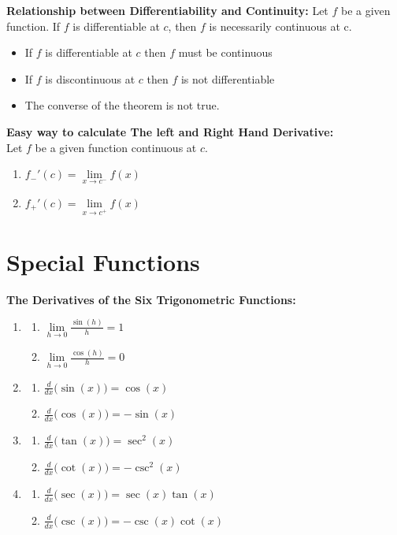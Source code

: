 \documentclass[14pt]{article}
\begin{document}
    \textbf{Relationship between Differentiability and Continuity:}
    Let $f$ be a given function. If $f$ is differentiable at $c$, then
    $f$ is necessarily continuous at c.
    \begin{itemize}
        \item If $f$ is differentiable at $c$ then $f$ must be
        continuous
        \item If $f$ is discontinuous at $c$ then $f$ is not
        differentiable
        \item The converse of the theorem is not true.
    \end{itemize} 
    \textbf{Easy way to calculate The left and Right Hand Derivative:}\\
    Let $f$ be a given function continuous at $c$.
    \begin{enumerate}
        \item $f_-'(c)=\lim \limits_{x \rightarrow c^-}f(x)$
        \item $f_+'(c)=\lim \limits_{x \rightarrow c^+}f(x)$
    \end{enumerate}
    \section{Special Functions}
    \textbf{The Derivatives of the Six Trigonometric Functions:}
    \begin{enumerate}
        \item \begin{enumerate}
            \item $\lim \limits_{h\rightarrow0} \frac{\sin(h)}{h}=1$
            \item $\lim \limits_{h\rightarrow0} \frac{\cos(h)}{h}=0$
        \end{enumerate}
        \item \begin{enumerate}
            \item $\frac{d}{dx}\Big(\sin(x)\Big)=\cos(x)$
            \item $\frac{d}{dx}\Big(\cos(x)\Big)=-\sin(x)$
        \end{enumerate}
        \item \begin{enumerate}
            \item $\frac{d}{dx}\Big(\tan(x)\Big)=\sec^2(x)$
            \item $\frac{d}{dx}\Big(\cot(x)\Big)=-\csc^2(x)$
        \end{enumerate}
        \item \begin{enumerate}
            \item $\frac{d}{dx}\Big(\sec(x)\Big)=\sec(x)\tan(x)$
            \item $\frac{d}{dx}\Big(\csc(x)\Big)=-\csc(x)\cot(x)$
        \end{enumerate}
    \end{enumerate}
\end{document}
